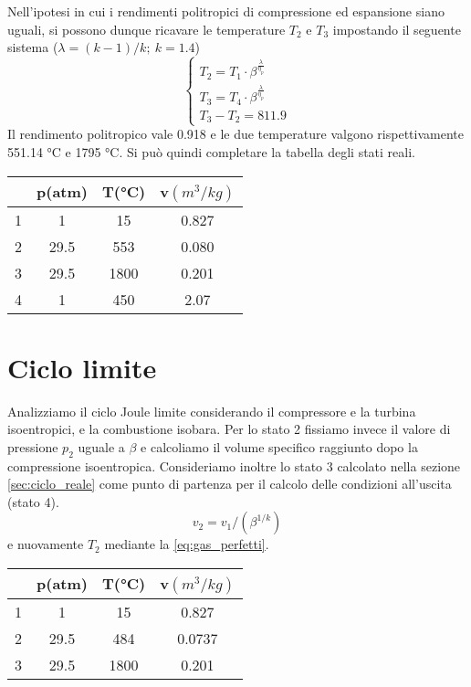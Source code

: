\documentclass[a4paper,12pt]{article}
\begin{document}
Nell'ipotesi in cui i rendimenti politropici di compressione ed espansione siano uguali, si possono dunque ricavare le temperature $T_2$ e $T_3$ impostando il seguente sistema
($\lambda = (k-1)/k;\ k=1.4$)
$$
\begin{cases}
    T_2 = T_1\cdot\beta^{\frac{\lambda}{\eta_p}} \\
    T_3 = T_4\cdot\beta^{\frac{\lambda}{\eta_p}}\\
    T_3-T_2 = 811.9
\end{cases}
$$
Il rendimento politropico vale 0.918 e le due temperature valgono rispettivamente 551.14 °C e 1795 °C.
Si può quindi completare la tabella degli stati reali.
\begin{center}
    \begin{tabular}{c|c|c|c}
            &p(atm) &T(°C)  &v$(m^3/kg)$     \\ \hline
        1   &    1  & 15    & 0.827   \\
        2   &   29.5&553    & 0.080   \\
        3   &   29.5&1800   & 0.201   \\
        4   &   1   & 450   & 2.07
    \end{tabular}
\end{center}

\section{Ciclo limite}
\label{sec:ciclo_limite}
Analizziamo il ciclo Joule limite considerando il compressore e la turbina isoentropici, e la combustione isobara.
Per lo stato 2 fissiamo invece il valore di pressione $p_2$ uguale a $\beta$ e calcoliamo il volume specifico raggiunto dopo la compressione isoentropica.
Consideriamo inoltre lo stato 3 calcolato nella sezione \ref{sec:ciclo_reale} come punto di partenza per il calcolo delle condizioni all'uscita (stato 4).
\begin{equation*}
    v_2 = v_1/(\beta^{1/k})
\end{equation*}
e nuovamente $T_2$ mediante la \eqref{eq:gas_perfetti}.
\begin{center}
    \begin{tabular}{c|c|c|c}
            &p(atm) &T(°C)  &v$(m^3/kg)$     \\ \hline
        1   &    1  & 15    & 0.827   \\
        2   &   29.5& 484   & 0.0737  \\
        3   &   29.5&1800   & 0.201   \\
    \end{tabular}
\end{center}
\end{document}
